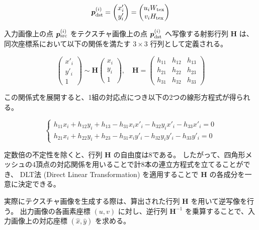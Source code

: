 \begin{equation}
  \bm{p}_{\rm dst}^{(i)} = \begin{pmatrix} x'_i \\ y'_i \end{pmatrix} 
  = \begin{pmatrix} u_i W_{\rm tex} \\ v_i H_{\rm tex} \end{pmatrix}
\end{equation}

入力画像上の点 $\bm{p}_{\rm src}^{(i)}$ をテクスチャ画像上の点 $\bm{p}_{\rm dst}^{(i)}$ へ写像する射影行列 $\bm{H}$ は、
同次座標系において以下の関係を満たす $3 \times 3$ 行列として定義される。

\begin{equation}
  \begin{pmatrix} x'_i \\ y'_i \\ 1 \end{pmatrix} \sim \bm{H}\begin{pmatrix} x_i \\ y_i \\ 1 \end{pmatrix}
  , \quad
  \bm{H} = \begin{pmatrix} h_{11} & h_{12} & h_{13} \\ h_{21} & h_{22} & h_{23} \\ h_{31} & h_{32} & h_{33} \end{pmatrix}
\end{equation}

この関係式を展開すると、1組の対応点につき以下の2つの線形方程式が得られる。

\begin{equation}
  \begin{cases}
    h_{11}x_i + h_{12}y_i + h_{13} - h_{31}x_i x'_i - h_{32}y_i x'_i - h_{33}x'_i = 0 \\
    h_{21}x_i + h_{22}y_i + h_{23} - h_{31}x_i y'_i - h_{32}y_i y'_i - h_{33}y'_i = 0
  \end{cases}
\end{equation}

定数倍の不定性を除くと、行列 $\bm{H}$ の自由度は8である。
したがって、四角形メッシュの4頂点の対応関係を用いることで計8本の連立方程式を立てることができ、
DLT法 (Direct Linear Transformation) を適用することで $\bm{H}$ の各成分を一意に決定できる。

実際にテクスチャ画像を生成する際は、算出された行列 $\bm{H}$ を用いて逆写像を行う。
出力画像の各画素座標 $(u, v)$ に対し、逆行列 $\bm{H}^{-1}$ を乗算することで、入力画像上の対応座標 $(\hat{x}, \hat{y})$ を求める。


